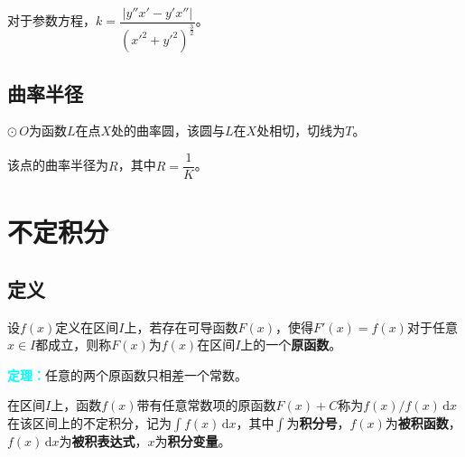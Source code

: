 \documentclass[UTF8, 12pt]{ctexart}
\begin{document}
        对于参数方程，$k=\dfrac{\vert y''x'-y'x''\vert}{\left(x'^2+y'^2\right)^{\frac{3}{2}}}$。

        \subsection{曲率半径}

        \begin{minipage}{0.5\linewidth}
            $\odot\,O$为函数$L$在点$X$处的曲率圆，该圆与$L$在$X$处相切，切线为$T$。

            该点的曲率半径为$R$，其中$R=\dfrac{1}{K}$。
        \end{minipage}
        \hfill
        \begin{minipage}{0.4\linewidth}
        \end{minipage}

        \section{不定积分}

        \subsection{定义}

        设$f(x)$定义在区间$I$上，若存在可导函数$F(x)$，使得$F'(x)=f(x)$对于任意$x\in I$都成立，则称$F(x)$为$f(x)$在区间$I$上的一个\textbf{原函数}。

        \textcolor{aqua}{\textbf{定理：}}任意的两个原函数只相差一个常数。

        在区间$I$上，函数$f(x)$带有任意常数项的原函数$F(x)+C$称为$f(x)/f(x)\,\textrm{d}x$在该区间上的不定积分，记为$\int f(x)\,\textrm{d}x$，其中$\int$为\textbf{积分号}，$f(x)$为\textbf{被积函数}，$f(x)\,\textrm{d}x$为\textbf{被积表达式}，$x$为\textbf{积分变量}。
\end{document}

